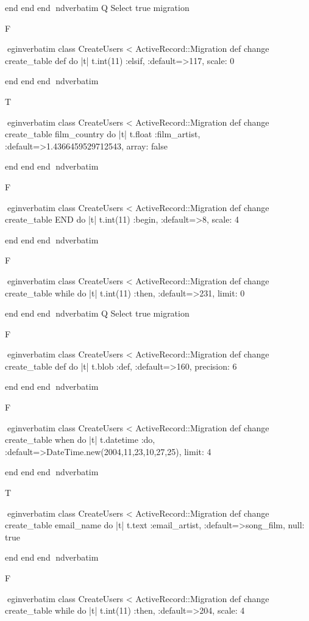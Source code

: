     end 
  end 
end
nd{verbatim}
Q
 Select true migration

F

egin{verbatim}
 class CreateUsers < ActiveRecord::Migration 
  def change 
    create_table def do |t| 
      t.int(11) :elsif, :default=>117, scale: 0
    
    end 
  end 
end
nd{verbatim}

T

egin{verbatim}
 class CreateUsers < ActiveRecord::Migration 
  def change 
    create_table film_country do |t| 
      t.float :film_artist, :default=>1.4366459529712543, array: false
    
    end 
  end 
end
nd{verbatim}

F

egin{verbatim}
 class CreateUsers < ActiveRecord::Migration 
  def change 
    create_table END do |t| 
      t.int(11) :begin, :default=>8, scale: 4
    
    end 
  end 
end
nd{verbatim}

F

egin{verbatim}
 class CreateUsers < ActiveRecord::Migration 
  def change 
    create_table while do |t| 
      t.int(11) :then, :default=>231, limit: 0
    
    end 
  end 
end
nd{verbatim}
Q
 Select true migration

F

egin{verbatim}
 class CreateUsers < ActiveRecord::Migration 
  def change 
    create_table def do |t| 
      t.blob :def, :default=>160, precision: 6
    
    end 
  end 
end
nd{verbatim}

F

egin{verbatim}
 class CreateUsers < ActiveRecord::Migration 
  def change 
    create_table when do |t| 
      t.datetime :do, :default=>DateTime.new(2004,11,23,10,27,25), limit: 4
    
    end 
  end 
end
nd{verbatim}

T

egin{verbatim}
 class CreateUsers < ActiveRecord::Migration 
  def change 
    create_table email_name do |t| 
      t.text :email_artist, :default=>song_film, null: true
    
    end 
  end 
end
nd{verbatim}

F

egin{verbatim}
 class CreateUsers < ActiveRecord::Migration 
  def change 
    create_table while do |t| 
      t.int(11) :then, :default=>204, scale: 4
    
